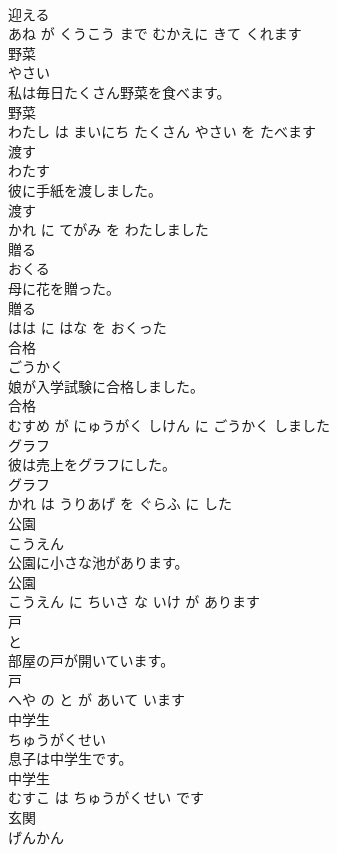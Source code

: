 \documentclass[8pt]{extreport}
\begin{document}
\begin{CJK}{UTF8}{min}
\\	迎える 
\\	あね が くうこう まで むかえに きて くれます			
\\	野菜	
\\	やさい			
\\	私は毎日たくさん野菜を食べます。	
\\	野菜 
\\	わたし は まいにち たくさん やさい を たべます			
\\	渡す	
\\	わたす			
\\	彼に手紙を渡しました。	
\\	渡す 
\\	かれ に てがみ を わたしました			
\\	贈る	
\\	おくる			
\\	母に花を贈った。	
\\	贈る 
\\	はは に はな を おくった			
\\	合格	
\\	ごうかく			
\\	娘が入学試験に合格しました。	
\\	合格 
\\	むすめ が にゅうがく しけん に ごうかく しました			
\\	グラフ	
\\	彼は売上をグラフにした。	
\\	グラフ 
\\	かれ は うりあげ を ぐらふ に した			
\\	公園	
\\	こうえん			
\\	公園に小さな池があります。	
\\	公園 
\\	こうえん に ちいさ な いけ が あります			
\\	戸	
\\	と			
\\	部屋の戸が開いています。	
\\	戸 
\\	へや の と が あいて います			
\\	中学生	
\\	ちゅうがくせい			
\\	息子は中学生です。	
\\	中学生 
\\	むすこ は ちゅうがくせい です			
\\	玄関	
\\	げんかん			

\end{CJK}
\end{document}
